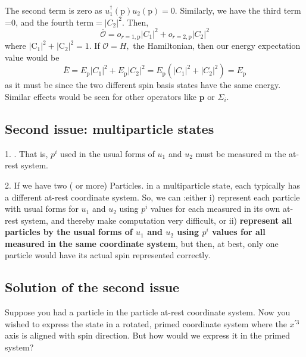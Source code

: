 The second term is zero as $u_{1}^{\dagger}(\mathrm{p}) u_{2}(\mathrm{p})=0$. Similarly, we have the third term =0, and the fourth term$=\left|C_{2}\right|^{2}$. Then,
$$
\overline{\mathcal{O}}=o_{r=1, \mathrm{p}}\left|C_{1}\right|^{2}+o_{r=2, \mathrm{p}}\left|C_{2}\right|^{2}
$$
where $\left|\mathrm{C}_{1}\right|^{2}+\left|\mathrm{C}_{2}\right|^{2}=1$.
If $\mathcal{O}=H,$ the Hamiltonian, then our energy expectation value would be
$$
\bar{E}=E_{\mathrm{p}}\left|C_{1}\right|^{2}+E_{\mathrm{p}}\left|C_{2}\right|^{2}=E_{\mathrm{p}}\left(\left|C_{1}\right|^{2}+\left|C_{2}\right|^{2}\right)=E_{\mathrm{p}}
$$
as it must be since the two different spin basis states have the same energy. Similar effects would be seen for other operators like $\mathbf{p}$ or $\Sigma_i$.

\subsection{Second issue: multiparticle states}
1. . That is, $p^i$ used in the usual forms of $u_1$ and $u_2$ must be measured m the at-rest system.

2. If we have two ( or more) Particles. in a multiparticle state, each typically has a different at-rest
coordinate system. So, we can :either i) represent each particle with usual forms for $u_1$ and $u_2$ using
$p^i$ values for each measured in its own at-rest system, and thereby make
computation very difficult, or ii) \textbf{represent all particles by the usual forms of $u_1$ and $u_2$ using $p^i$
values for all measured in the same coordinate system}, but then, at best, only one particle would
have its actual spin represented correctly.

\subsection{Solution of the second issue}
Suppose you had a particle in the particle at-rest coordinate system. Now you wished to express the state in a rotated, primed coordinate system where the $x^{\prime 3}$ axis is aligned with spin direction. But how would we express it in the primed system?


